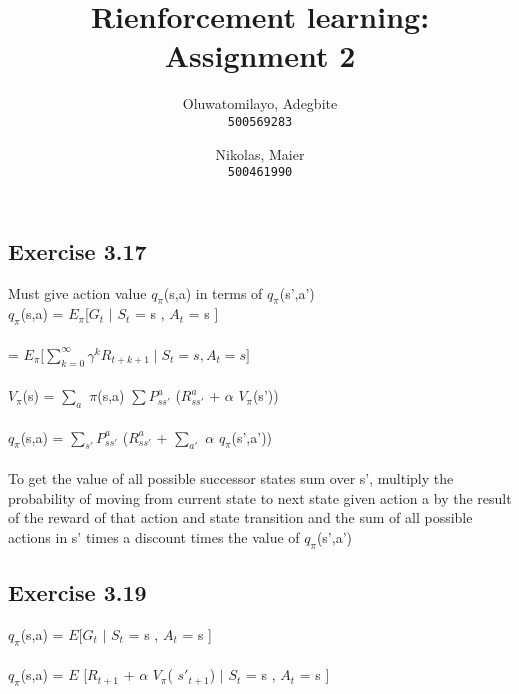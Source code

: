 \documentclass[12pt]{extarticle}
\title{Rienforcement learning: Assignment 2}
\author{
  Oluwatomilayo, Adegbite\\
  \texttt{500569283}
  \and
  Nikolas, Maier\\
  \texttt{500461990}
}
\newcommand{\<}{\langle}
\renewcommand{\>}{\rangle}
\theoremstyle{definition}
\begin{document}
\maketitle

\section{}
\subsection{Exercise 3.17}
Must give action value $q_\pi$(s,a)  in terms of $q_\pi$(s',a') \\ 


$q_\pi$(s,a) =  $E_\pi$[$G_t$ $ \mid $ $S_t$ = s , $A_t$ = s   ] \\   \\
=  $E_\pi [  $$\sum_{k=0}^{ \infty}$$ \gamma^k R_{t+k+1}  \mid S_t = s , A_t = s   ]$ \\  \\

$V_\pi$(s) =  $\sum_a$ $\pi$(s,a) $\sum$$P_{s s'}^ a$ ($R_{s s'}^ a$ +  $\alpha$ $V_\pi$(s')) \\ \\

$q_\pi$(s,a) =  $\sum_{s'}$$P_{s s'}^ a$ ($R_{s s'}^ a$ +   $\sum_{a'}$ $\alpha$  $q_\pi$(s',a'))  \\ \\
  To get the value of all possible successor states sum over s', multiply the probability of moving from current state to next state given action a by the result of the reward of that action and state transition and the sum of all possible actions in s' times a discount times the value of $q_\pi$(s',a')

\subsection{Exercise 3.19} 

$q_\pi$(s,a) =  $E$[$G_t$ $ \mid $ $S_t$ = s , $A_t$ = s   ] \\   \\

$q_\pi$(s,a) =  $E$ [$R_{t+1}$ + $\alpha$ $V_\pi$( $s'_{t+1}$)  $ \mid $ $S_t$ = s , $A_t$ = s   ] \\  \\
\end{document}
